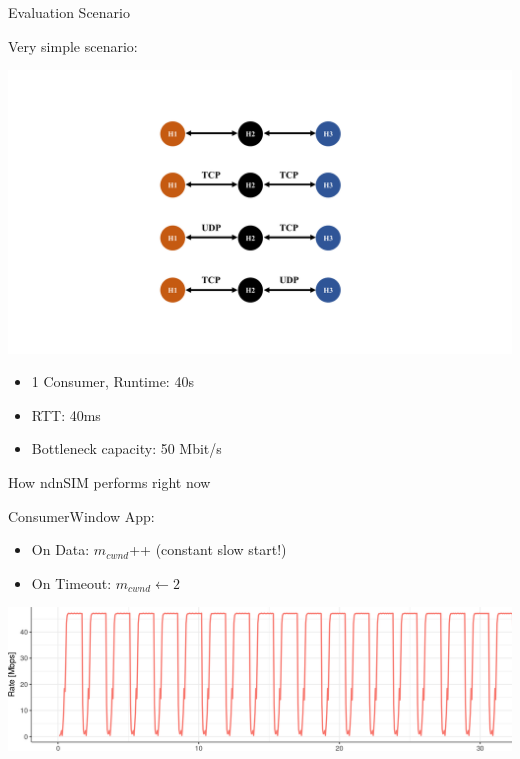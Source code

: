 \begin{frame}{Evaluation Scenario}

Very simple scenario: 

\includegraphics[width=\linewidth]{figs/Figure_3.pdf}

\begin{itemize}
\item 1 Consumer, Runtime: 40s 
\item RTT: 40ms 
\item Bottleneck capacity: 50 Mbit/s 
\end{itemize}


\end{frame}


\begin{frame}{How ndnSIM performs right now}

ConsumerWindow App: 

\begin{itemize}
\item On Data: $m_{cwnd}$++ (constant slow start!)
\item On Timeout: $m_{cwnd} \leftarrow 2$
\end{itemize}

\pause
\includegraphics[width=\linewidth]{figs/cons1.png}


\end{frame}

